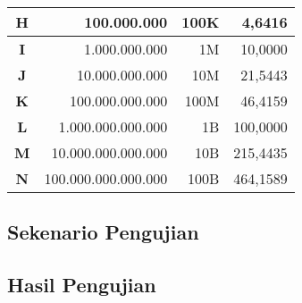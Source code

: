 \begin{table}[htbp]
\begin{tabular}{|c|r|r|r|}
		\hline
		\rowcolor[rgb]{ .851,  .851,  .851} \textbf{H} & \cellcolor[rgb]{ 1,  1,  1}100.000.000 & \cellcolor[rgb]{ 1,  1,  1}100K & \cellcolor[rgb]{ 1,  1,  1}4,6416 \bigstrut\\
		\hline
		\rowcolor[rgb]{ .851,  .851,  .851} \textbf{I} & \cellcolor[rgb]{ 1,  1,  1}1.000.000.000 & \cellcolor[rgb]{ 1,  1,  1}1M & \cellcolor[rgb]{ 1,  1,  1}10,0000 \bigstrut\\
		\hline
		\rowcolor[rgb]{ .851,  .851,  .851} \textbf{J} & \cellcolor[rgb]{ 1,  1,  1}10.000.000.000 & \cellcolor[rgb]{ 1,  1,  1}10M & \cellcolor[rgb]{ 1,  1,  1}21,5443 \bigstrut\\
		\hline
		\rowcolor[rgb]{ .851,  .851,  .851} \textbf{K} & \cellcolor[rgb]{ 1,  1,  1}100.000.000.000 & \cellcolor[rgb]{ 1,  1,  1}100M & \cellcolor[rgb]{ 1,  1,  1}46,4159 \bigstrut\\
		\hline
		\rowcolor[rgb]{ .851,  .851,  .851} \textbf{L} & \cellcolor[rgb]{ 1,  1,  1}1.000.000.000.000 & \cellcolor[rgb]{ 1,  1,  1}1B & \cellcolor[rgb]{ 1,  1,  1}100,0000 \bigstrut\\
		\hline
		\rowcolor[rgb]{ .851,  .851,  .851} \textbf{M} & \cellcolor[rgb]{ 1,  1,  1}10.000.000.000.000 & \cellcolor[rgb]{ 1,  1,  1}10B & \cellcolor[rgb]{ 1,  1,  1}215,4435 \bigstrut\\
		\hline
		\rowcolor[rgb]{ .851,  .851,  .851} \textbf{N} & \cellcolor[rgb]{ 1,  1,  1}100.000.000.000.000 & \cellcolor[rgb]{ 1,  1,  1}100B & \cellcolor[rgb]{ 1,  1,  1}464,1589 \bigstrut\\
		\hline
	\end{tabular}%
	\label{tab:addlaasdbel}%
\end{table}%


\subsection{Sekenario Pengujian}

\subsection{Hasil Pengujian}

